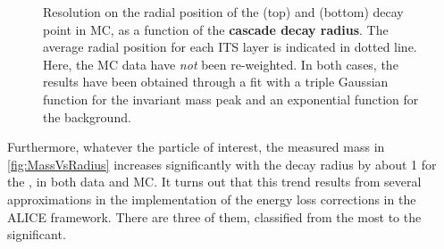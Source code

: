 \begin{figure}[t]
\hspace*{-2.cm}
\caption{Resolution on the radial position of the \rmXi (top) and \rmOmega (bottom) decay point in MC, as a function of the \textbf{cascade decay radius}. The average radial position for each ITS layer is indicated in dotted line. Here, the MC data have \textit{not} been re-weighted. In both cases, the results have been obtained through a fit with a triple Gaussian function for the invariant mass peak and an exponential function for the background.}
	\label{fig:RadiusResolVsRadius}
\end{figure}

Furthermore, whatever the particle of interest, the measured mass in \fig\ref{fig:MassVsRadius} increases significantly with the decay radius by about 1 \mmass for the \rmXi, in both data and MC. It turns out that this trend results from several approximations in the implementation of the energy loss corrections in the ALICE framework. There are three of them, classified from the most to the  significant.

